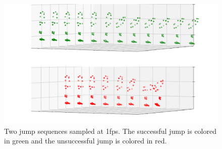 \begin{figure}
\begin{center}
\includegraphics{images/4-experiments/sample_sequence.png}
\end{center}
\caption{Two jump sequences sampled at 1fps. The successful jump is colored in green and the unsuccessful jump is colored in red.}
\label{figure:sample sequence}
\end{figure}

